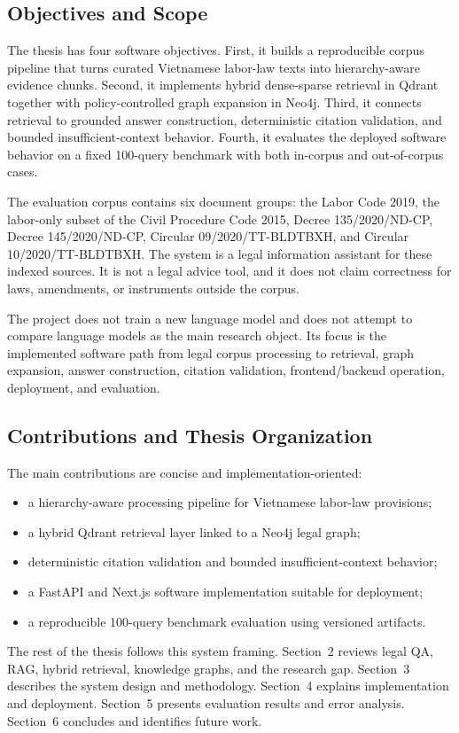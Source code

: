 \subsection{Objectives and Scope}
The thesis has four software objectives. First, it builds a reproducible corpus pipeline that turns curated Vietnamese labor-law texts into hierarchy-aware evidence chunks. Second, it implements hybrid dense-sparse retrieval in Qdrant together with policy-controlled graph expansion in Neo4j. Third, it connects retrieval to grounded answer construction, deterministic citation validation, and bounded insufficient-context behavior. Fourth, it evaluates the deployed software behavior on a fixed 100-query benchmark with both in-corpus and out-of-corpus cases.

The evaluation corpus contains six document groups: the Labor Code 2019, the labor-only subset of the Civil Procedure Code 2015, Decree 135/2020/ND-CP, Decree 145/2020/ND-CP, Circular 09/2020/TT-BLDTBXH, and Circular 10/2020/TT-BLDTBXH. The system is a legal information assistant for these indexed sources. It is not a legal advice tool, and it does not claim correctness for laws, amendments, or instruments outside the corpus.

The project does not train a new language model and does not attempt to compare language models as the main research object. Its focus is the implemented software path from legal corpus processing to retrieval, graph expansion, answer construction, citation validation, frontend/backend operation, deployment, and evaluation.

\subsection{Contributions and Thesis Organization}
The main contributions are concise and implementation-oriented:
\begin{itemize}
  \item a hierarchy-aware processing pipeline for Vietnamese labor-law provisions;
  \item a hybrid Qdrant retrieval layer linked to a Neo4j legal graph;
  \item deterministic citation validation and bounded insufficient-context behavior;
  \item a FastAPI and Next.js software implementation suitable for deployment;
  \item a reproducible 100-query benchmark evaluation using versioned artifacts.
\end{itemize}

The rest of the thesis follows this system framing. Section~2 reviews legal QA, RAG, hybrid retrieval, knowledge graphs, and the research gap. Section~3 describes the system design and methodology. Section~4 explains implementation and deployment. Section~5 presents evaluation results and error analysis. Section~6 concludes and identifies future work.
